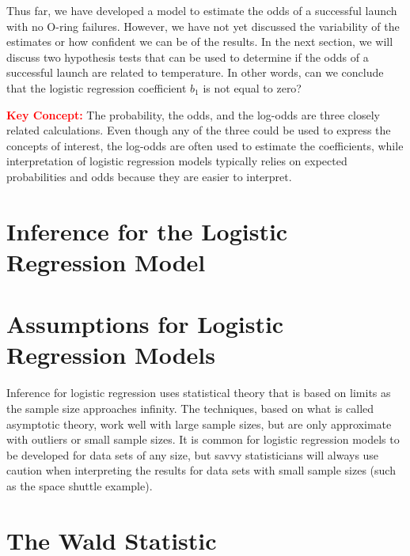 \documentclass[
]{report}
\begin{document}
Thus far, we have developed a model to estimate the odds of a successful launch with no O-ring failures. However, we have not yet discussed the variability of the estimates or how confident we can be of the results. In the next section, we will discuss two hypothesis tests that can be used to determine if the odds of a successful launch are related to temperature. In other words, can we conclude that the logistic regression coefficient \(b_1\) is not equal to zero?

\Large

\textbf{\textcolor{red}{Key Concept:}}
\color{red}
The probability, the odds, and the log-odds are three closely related calculations. Even though any of
the three could be used to express the concepts of interest, the log-odds are often used to estimate the
coefficients, while interpretation of logistic regression models typically relies on expected probabilities
and odds because they are easier to interpret.
\color{black}
\normalsize

\hypertarget{inference-for-the-logistic-regression-model}{%
\section{\texorpdfstring{\textbf{Inference for the Logistic Regression Model}}{Inference for the Logistic Regression Model}}\label{inference-for-the-logistic-regression-model}}

\hypertarget{assumptions-for-logistic-regression-models}{%
\section*{Assumptions for Logistic Regression Models}\label{assumptions-for-logistic-regression-models}}

Inference for logistic regression uses statistical theory that is based on limits as the sample size approaches infinity. The techniques, based on what is called asymptotic theory, work well with large sample sizes, but are only approximate with outliers or small sample sizes. It is common for logistic regression models to be developed for data sets of any size, but savvy statisticians will always use caution when interpreting the results for data sets with small sample sizes (such as the space shuttle example).

\hypertarget{the-wald-statistic}{%
\section*{The Wald Statistic}\label{the-wald-statistic}}
\end{document}
